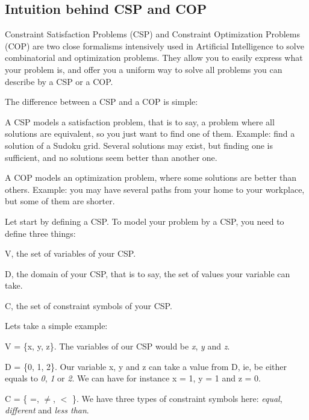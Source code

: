 \subsection*{Intuition behind C\+SP and C\+OP }

Constraint Satisfaction Problems (C\+SP) and Constraint Optimization Problems (C\+OP) are two close formalisms intensively used in Artificial Intelligence to solve combinatorial and optimization problems. They allow you to easily express what your problem is, and offer you a uniform way to solve all problems you can describe by a C\+SP or a C\+OP.

The difference between a C\+SP and a C\+OP is simple\+:


\begin{DoxyItemize}
\item A C\+SP models a satisfaction problem, that is to say, a problem where all solutions are equivalent, so you just want to find one of them. Example\+: find a solution of a Sudoku grid. Several solutions may exist, but finding one is sufficient, and no solutions seem better than another one.
\item A C\+OP models an optimization problem, where some solutions are better than others. Example\+: you may have several paths from your home to your workplace, but some of them are shorter.
\end{DoxyItemize}

Let start by defining a C\+SP. To model your problem by a C\+SP, you need to define three things\+:


\begin{DoxyItemize}
\item V, the set of variables of your C\+SP.
\item D, the domain of your C\+SP, that is to say, the set of values your variable can take.
\item C, the set of constraint symbols of your C\+SP.
\end{DoxyItemize}

Let\textquotesingle{}s take a simple example\+:


\begin{DoxyItemize}
\item V = \{x, y, z\}. The variables of our C\+SP would be {\itshape x}, {\itshape y} and {\itshape z}.
\item D = \{0, 1, 2\}. Our variable x, y and z can take a value from D, ie, be either equals to {\itshape 0}, {\itshape 1} or {\itshape 2}. We can have for instance x = 1, y = 1 and z = 0.
\item C = \{ =, {$\ne$}, $<$ \}. We have three types of constraint symbols here\+: {\itshape equal}, {\itshape different} and {\itshape less than}.
\end{DoxyItemize}

